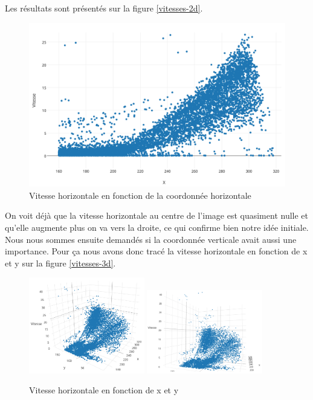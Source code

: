 \documentclass[titlepage,11pt,a4paper]{article}
\begin{document}
Les résultats sont présentés sur la figure \vref{vitesses-2d}.

\begin{figure}
	\centering
	\caption{\label{vitesses-2d} Vitesse horizontale en fonction de la coordonnée horizontale}
	\includegraphics[scale=0.45]{images/vitesses-2d.png}
\end{figure}

On voit déjà que la vitesse horizontale au centre de l'image est quasiment nulle et qu'elle augmente plus on va vers la droite, ce qui confirme bien notre idée initiale. Nous nous sommes ensuite demandés si la coordonnée verticale avait aussi une importance. Pour ça nous avons donc tracé la vitesse horizontale en fonction de x et y sur la figure \vref{vitesses-3d}.

\begin{figure}
	\centering
	\caption{\label{vitesses-3d} Vitesse horizontale en fonction de x et y}
	\includegraphics[width=0.45\textwidth]{images/vitesses-3d-apercu.png}
	\hfill
	\includegraphics[width=0.45\textwidth]{images/vitesses-3d-selon-y.png}
\end{figure}
\end{document}
